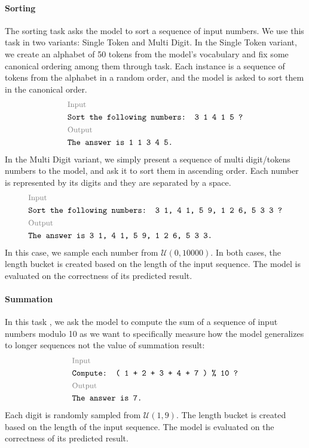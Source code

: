 \documentclass{article}
\begin{document}
\paragraph{Sorting}
The sorting task \citep{Saxton2018:DeepmindMath} asks the model to sort a sequence of input numbers.
We use this task in two variants: Single Token and Multi Digit.
In the Single Token variant, we create an alphabet of 50 tokens from the model's vocabulary and fix some canonical ordering among them through task. Each instance is a sequence of tokens from the alphabet in a random order, and the model is asked to sort them in the canonical order.
\[
  \begin{aligned}
     & \text{\footnotesize \color{gray} Input}          \\
     & \texttt{Sort the following numbers: 3 1 4 1 5 ?} \\
     & \text{\footnotesize \color{gray} Output}         \\
     & \texttt{The answer is 1 1 3 4 5.}                \\
  \end{aligned}
\]
In the Multi Digit variant, we simply present a sequence of multi digit/tokens numbers to the model, and ask it to sort them in ascending order. Each number is represented by its digits and they are separated by a space.
\[
  \begin{aligned}
     & \text{\footnotesize \color{gray} Input}                            \\
     & \texttt{Sort the following numbers: 3 1, 4 1, 5 9, 1 2 6, 5 3 3 ?} \\
     & \text{\footnotesize \color{gray} Output}                           \\
     & \texttt{The answer is 3 1, 4 1, 5 9, 1 2 6, 5 3 3.}                \\
  \end{aligned}
\]
In this case, we sample each number from $\mathcal{U}(0, 10000)$. In both cases, the length bucket is created based on the length of the input sequence. The model is evaluated on the correctness of its predicted result.

\paragraph{Summation}
In this task \citep{Saxton2018:DeepmindMath}, we ask the model to compute the sum of a sequence of input numbers modulo 10 as we want to specifically measure how the model generalizes to longer sequences not the value of summation result:
\[
  \begin{aligned}
     & \text{\footnotesize \color{gray} Input}          \\
     & \texttt{Compute: ( 1 + 2 + 3 + 4 + 7 ) \% 10 ?} \\
     & \text{\footnotesize \color{gray} Output}         \\
     & \texttt{The answer is 7.}                        \\
  \end{aligned}
\]
Each digit is randomly sampled from $\mathcal{U}(1, 9)$. The length bucket is created based on the length of the input sequence. The model is evaluated on the correctness of its predicted result.
\end{document}
